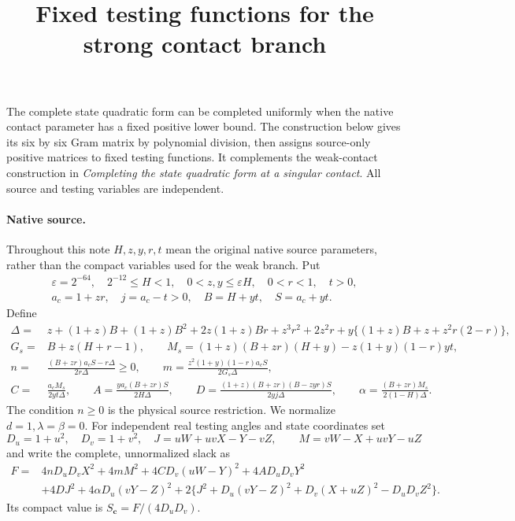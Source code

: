 \documentclass[10pt]{article}
\title{Fixed testing functions for the strong contact branch}
\author{}
\date{}
\newcommand{\eps}{\varepsilon}
\newcommand{\Du}{D_u}
\newcommand{\Dv}{D_v}
\begin{document}
\maketitle
\vspace{-7mm}
The complete state quadratic form can be completed uniformly when the
native contact parameter has a fixed positive lower bound. The construction
below gives its six by six Gram matrix by polynomial division, then assigns
source-only positive matrices to fixed testing functions. It complements
the weak-contact construction in \emph{Completing the state quadratic form
at a singular contact}. All source and testing variables are independent.

\paragraph{Native source.}
Throughout this note \(H,z,y,r,t\) mean the original native source parameters,
rather than the compact variables used for the weak branch. Put
\[
 \begin{gathered}
 \eps=2^{-64},\quad 2^{-12}\le H<1,\quad
 0<z,y\le\eps H,\quad 0<r<1,\quad t>0,\\
 a_c=1+zr,\quad j=a_c-t>0,\quad B=H+yt,\quad S=a_c+yt.
 \end{gathered}
\]
Define
\begin{align}
 \Delta={}&z+(1+z)B+(1+z)B^2+2z(1+z)Br+z^3r^2+2z^2r
       +y\{(1+z)B+z+z^2r(2-r)\},\nonumber\\
 G_s={}&B+z(H+r-1),\qquad
 M_s=(1+z)(B+zr)(H+y)-z(1+y)(1-r)yt,                 \label{eq:sourcepolys}\\
 n={}&\frac{(B+zr)a_cS-r\Delta}{2r\Delta}\ge0,\qquad
 m=\frac{z^2(1+y)(1-r)a_cS}{2G_s\Delta},\nonumber\\
 C={}&\frac{a_cM_s}{2yt\Delta},\qquad
 A=\frac{ya_c(B+zr)S}{2H\Delta},\qquad
 D=\frac{(1+z)(B+zr)(B-zyr)S}{2yj\Delta},\qquad
 \alpha=\frac{(B+zr)M_s}{2(1-H)\Delta}.              \label{eq:source}
\end{align}
The condition \(n\ge0\) is the physical source restriction.
We normalize \(d=1,\lambda=\beta=0\).
For independent real testing angles and state coordinates set
\[
 \Du=1+u^2,\quad \Dv=1+v^2,\quad
 J=uW+uvX-Y-vZ,\qquad M=vW-X+uvY-uZ
\]
and write the complete, unnormalized slack as
\begin{equation}
\begin{split}
 F={}&4n\Du\Dv X^2+4mM^2+4C\Dv(uW-Y)^2+4A\Du\Dv Y^2\\
 &+4DJ^2+4\alpha\Du(vY-Z)^2
       +2\{J^2+\Du(vY-Z)^2+\Dv(X+uZ)^2-\Du\Dv Z^2\}.
\end{split}\label{eq:fullparent}
\end{equation}
Its compact value is \(S_{\mathbf c}=F/(4\Du\Dv)\).
\end{document}
